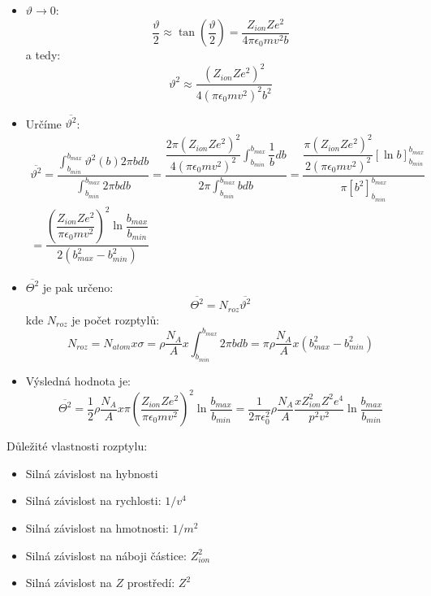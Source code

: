 \documentclass[../../main.tex]{subfiles}
\begin{document}
\begin{itemize}
	\item $\vartheta \rightarrow 0$: 
	\begin{equation}
	\dfrac{\vartheta}{2} \approx \tan \left( \dfrac{\vartheta}{2} \right) = \dfrac{Z_{ion} Z e^2}{4 \pi \epsilon_0 m v^2 b} 
	\end{equation}
	a tedy:
	\begin{equation}
	\vartheta ^2 \approx \dfrac{(Z_{ion} Z e^2)^2}{4 (\pi \epsilon_0 m v^2 )^2 b^2}
	\end{equation}
	\item Určíme $\overline{\vartheta ^2}$:
	\begin{equation}
	\begin{gathered}
	\overline{\vartheta ^2} = \dfrac{\int_{b_{min}}^{b_{max}} \vartheta ^2 (b) 2 \pi b db}{\int_{b_{min}}^{b_{max}} 2 \pi b db} = \dfrac{\dfrac{2 \pi (Z_{ion} Z e^2)^2}{4 (\pi \epsilon_0 m v^2)^2} \int_{b_{min}}^{b_{max}} \dfrac{1}{b}db}{2 \pi \int_{b_{min}}^{b_{max}}b db} = \dfrac{\dfrac{ \pi (Z_{ion} Z e^2)^2}{2 (\pi \epsilon_0 m v^2)^2} [\ln b]_{b_{min}} ^{b_{max}}}{\pi [b^2]_{b_{min}}^{b_{max}}}\\  = \dfrac{\left( \dfrac{Z_{ion} Z e^2}{\pi \epsilon_0 m v^2}\right)^2 \ln \dfrac{b_{max}}{b_{min}} }{2 (b_{max}^2 - b_{min}^2)}
	\end{gathered}
	\end{equation}
	\item $\overline{\varTheta ^2}$ je pak určeno: 
	\begin{equation}
	\overline{\varTheta ^2} = N_{roz} \overline{\vartheta ^2} 
	\end{equation}
	kde $N_{roz}$ je počet rozptylů:
	\begin{equation}
	N_{roz} = N_{atom} x \sigma = \rho \dfrac{N_A}{A} x \int_{b_{min}}^{b_{max}} 2 \pi b db = \pi \rho \dfrac{N_A}{A} x (b_{max}^2-b_{min}^2) 
	\end{equation}
	\item Výsledná hodnota je:
	\begin{equation}
	\overline{\varTheta ^2} = \dfrac{1}{2} 	\rho \dfrac{N_A}{A} x \pi \left(\dfrac{Z_{ion} Z e^2}{\pi \epsilon_0 m v^2} \right)^2 \ln \dfrac{b_{max}}{b_{min}} = \dfrac{1}{2 \pi \epsilon_{0}^2} \rho \dfrac{N_A}{A} \dfrac{x Z_{ion} ^2 Z^2 e^4}{p^2 v^2} \ln \dfrac{b_{max}}{b_{min}}
	\end{equation}
\end{itemize}

Důležité vlastnosti rozptylu:
\begin{itemize}
	\item Silná závislost na hybnosti
	\item Silná závislost na rychlosti: $1/v^4$
	\item Silná závislost na hmotnosti: $1/m^2$
	\item Silná závislost na náboji částice: $Z_{ion}^2$
	\item Silná závislost na $Z$ prostředí: $Z^2$
\end{itemize}
\end{document}

